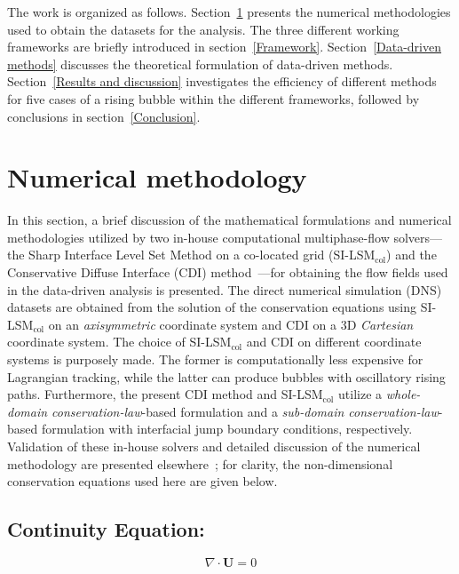 \documentclass[a4paper,fleqn]{cas-sc}
\begin{document}
	The work is organized as follows. Section~\ref{Numerical methodology} presents the numerical methodologies used to obtain the datasets for the analysis. The three different working frameworks are briefly introduced in section~\ref{Framework}. Section~\ref {Data-driven methods} discusses the theoretical formulation of data-driven methods. Section~\ref{Results and discussion} investigates the efficiency of different methods for five cases of a rising bubble within the different frameworks, followed by conclusions in section~\ref{Conclusion}.
	\section{Numerical methodology}
	\label{Numerical methodology}
	
	In this section, a brief discussion of the mathematical formulations and numerical methodologies utilized by two in-house computational multiphase-flow solvers---the Sharp Interface Level Set Method on a co-located grid (SI-LSM$_{\text{col}}$) \cite{Chirammel2023} and the Conservative Diffuse Interface (CDI) method~\cite{Jain2020}---for obtaining the flow fields used in the data-driven analysis is presented. The direct numerical simulation (DNS) datasets are obtained from the solution of the conservation equations using SI-LSM$_{\text{col}}$ on an \textit{axisymmetric} coordinate system and CDI on a 3D \textit{Cartesian} coordinate system. The choice of SI-LSM$_{\text{col}}$ and CDI on different coordinate systems is purposely made. The former is computationally less expensive for Lagrangian tracking, while the latter can produce bubbles with oscillatory rising paths. Furthermore, the present CDI method and SI-LSM$_{\text{col}}$ utilize a \textit{whole-domain conservation-law}-based formulation and a \textit{sub-domain conservation-law}-based formulation with interfacial jump boundary conditions, respectively. Validation of these in-house solvers and detailed discussion of the numerical methodology are presented elsewhere~\cite{Chirammel2023, Salimi2025}; for clarity, the non-dimensional conservation equations used here are given below.
	
	\subsection*{Continuity Equation:}
	\begin{equation}\label{eqt:continuity}
		\nabla\cdot\mathbf{U}=0
	\end{equation}
\end{document}
